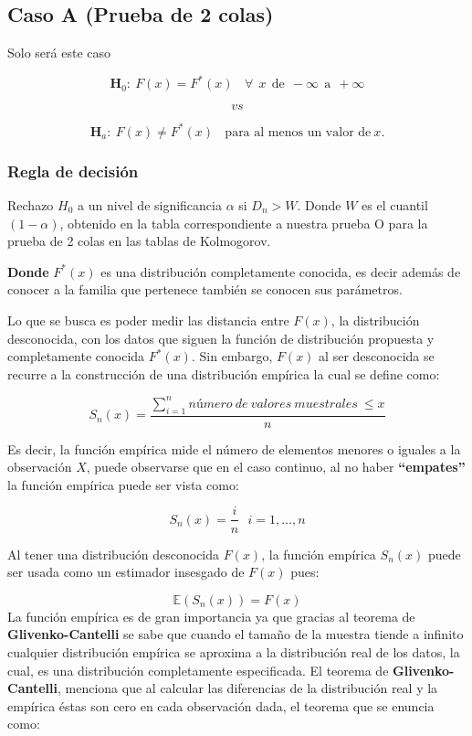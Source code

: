 \documentclass[
  a4paper,
  oneside,
  openany]{book}
\begin{document}
\hypertarget{caso-a-prueba-de-2-colas-2}{%
\subsection{Caso A (Prueba de 2 colas)}\label{caso-a-prueba-de-2-colas-2}}

Solo será este caso

\[\textbf{H}_0: \ F(x)=F^*(x) \ \ \ \ \forall \ \ x\ \  \mbox{de} \ \ -\infty \ \  \mbox{a} \ \  +\infty\]

\[vs\]

\[\textbf{H}_a: \ F(x) \neq F^*(x) \ \ \ \ \mbox{para al menos un valor de} \  x.\]

\hypertarget{regla-de-decisiuxf3n-31}{%
\subsubsection*{Regla de decisión}\label{regla-de-decisiuxf3n-31}}


Rechazo \(H_0\) a un nivel de significancia \(\alpha\) si \(D_{n}>W\). Donde \(W\) es el cuantil \((1-\alpha)\), obtenido en la tabla correspondiente a nuestra prueba O para la prueba de 2 colas en las tablas de Kolmogorov.

\textbf{Donde} \(F^*(x)\) es una distribución completamente conocida, es decir además de conocer a la familia que pertenece también se conocen sus parámetros.

Lo que se busca es poder medir las distancia entre \(F(x)\), la distribución desconocida, con
los datos que siguen la función de distribución propuesta y completamente conocida \(F^*(x)\).
Sin embargo, \(F(x)\) al ser desconocida se recurre a la construcción de una distribución empírica
la cual se define como:

\[S_{n}(x)=\frac{ \sum_{i=1}^{n}número\ de\ valores\ muestrales\ \leq x}{n}\]

Es decir, la función empírica mide el número de elementos menores o iguales a la observación
\(X\), puede observarse que en el caso continuo, al no haber \textbf{``empates''} la función empírica puede
ser vista como:

\[S_{n}(x)=\frac{i}{n} \ \ \ i=1,\ldots,n\]

Al tener una distribución desconocida \(F(x)\), la función empírica \(S_{n}(x)\) puede ser usada
como un estimador insesgado de \(F(x)\) pues:

\[\mathbb{E}(S_{n}(x))=F(x)\]
La función empírica es de gran importancia ya que gracias al teorema de \textbf{Glivenko-Cantelli}
se sabe que cuando el tamaño de la muestra tiende a infinito cualquier distribución empírica
se aproxima a la distribución real de los datos, la cual, es una distribución completamente especificada. El teorema de \textbf{Glivenko-Cantelli}, menciona que al calcular las diferencias de la distribución real y la empírica éstas son cero en cada observación dada, el teorema que se enuncia como:
\end{document}
